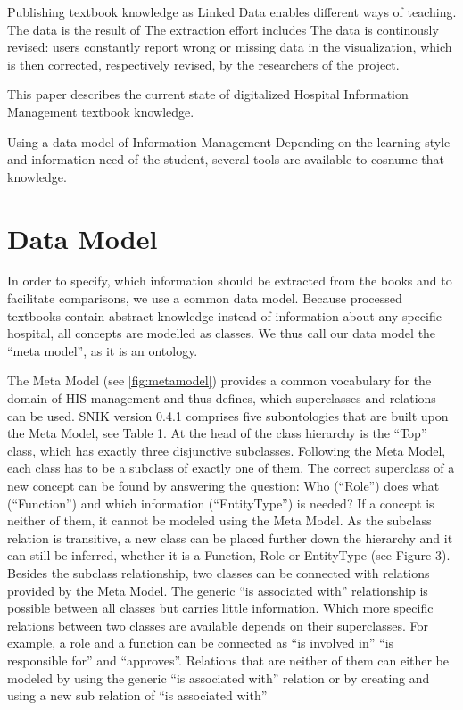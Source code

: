 \documentclass[sw]{iosart2x}
\begin{document}
Publishing textbook knowledge as Linked Data enables different ways of teaching.
The data is the result of 
The extraction effort includes 
The data is continously revised: users constantly report wrong or missing data in the visualization, which is then corrected, respectively revised, by the researchers of the project.

This paper describes the current state of digitalized Hospital Information Management textbook knowledge.

Using a data model of Information Management 
Depending on the learning style and information need of the student, several tools are available to cosnume that knowledge.

\section{Data Model}
In order to specify, which information should be extracted from the books and to facilitate comparisons, we use a common data model.
Because processed textbooks contain abstract knowledge instead of information about any specific hospital, all concepts are modelled as classes.
We thus call our data model the \enquote{meta model}, as it is an ontology.

The Meta Model (see \cref{fig:metamodel}) provides a common vocabulary for the domain of HIS management and thus defines, which superclasses and relations can be used.
SNIK version 0.4.1 comprises five subontologies that are built upon the Meta Model, see Table 1.
At the head of the class hierarchy is the \enquote{Top} class, which has exactly three disjunctive subclasses.
Following the Meta Model, each class has to be a subclass of exactly one of them.
The correct superclass of a new concept can be found by answering the question: Who (\enquote{Role}) does what (\enquote{Function}) and which information (\enquote{EntityType}) is needed? If a concept is neither of them, it cannot be modeled using the Meta Model.
As the subclass relation is transitive, a new class can be placed further down the hierarchy and it can still be inferred, whether it is a Function, Role or EntityType (see Figure 3).
Besides the subclass relationship, two classes can be connected with relations provided by the Meta Model.
The generic \enquote{is associated with} relationship is possible between all classes but carries little information.
Which more specific relations between two classes are available depends on their superclasses.
For example, a role and a function can be connected as \enquote{is involved in} \enquote{is responsible for} and \enquote{approves}.
Relations that are neither of them can either be modeled by using the generic \enquote{is associated with} relation or by creating and using a new sub relation of \enquote{is associated with}
\end{document}

